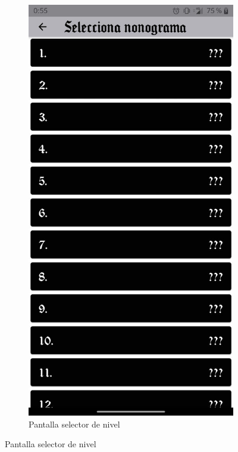 \begin{figure}[H]
    \centering
    \begin{subfigure}[b]{0.45\linewidth}
      \includegraphics[width=\linewidth]{images/man3.jpeg}
      \caption{Pantalla selector de nivel}

\end{subfigure}
\end{figure}
